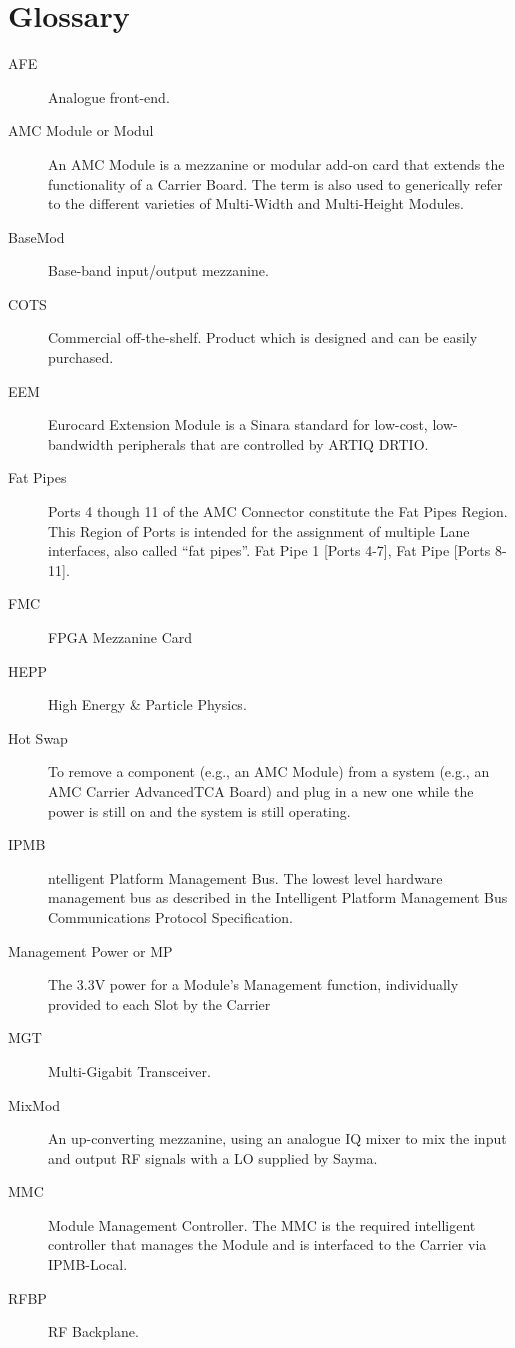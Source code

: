 \section{Glossary}

\begin{description}
	\item[AFE] Analogue front-end.
	\item[AMC Module or Modul] An AMC Module is a mezzanine or modular add-on card that extends the
	functionality of a Carrier Board. The term is also used to generically refer to the
	different varieties of Multi-Width and Multi-Height Modules.
	\item[BaseMod] Base-band input/output mezzanine.
	\item[COTS] Commercial off-the-shelf. Product which is designed and can be easily purchased.
	\item[EEM] Eurocard Extension Module is a Sinara standard for low-cost, low-bandwidth peripherals that are controlled by ARTIQ DRTIO.
	\item[Fat Pipes] Ports 4 though 11 of the AMC Connector constitute the Fat Pipes Region. This
	Region of Ports is intended for the assignment of multiple Lane interfaces, also
	called “fat pipes”. Fat Pipe 1 [Ports 4-7], Fat Pipe [Ports 8-11].
	\item[FMC] FPGA Mezzanine Card
	\item[HEPP] High Energy \& Particle Physics.
	\item[Hot Swap] To remove a component (e.g., an AMC Module) from a system (e.g., an AMC Carrier
	AdvancedTCA Board) and plug in a new one while the power is still on and the
	system is still operating.
	\item[IPMB] ntelligent Platform Management Bus. The lowest level hardware management bus
	as described in the Intelligent Platform Management Bus Communications Protocol
	Specification.
	\item[Management Power or MP] The 3.3V power for a Module's Management function, individually provided to each Slot by the Carrier
	\item[MGT] Multi-Gigabit Transceiver.	
	\item[MixMod] An up-converting mezzanine, using an analogue IQ mixer to mix the input and output RF signals with a LO supplied by Sayma.
	\item[MMC] Module Management Controller. The MMC is the required intelligent controller that
	manages the Module and is interfaced to the Carrier via IPMB-Local.
	\item[RFBP] RF Backplane.

\end{description}
